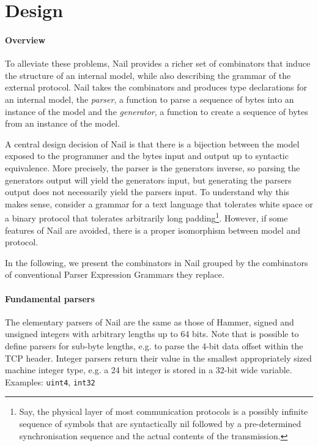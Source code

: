 \section{Design}

\paragraph{Overview}
To alleviate these problems, Nail provides a richer set of combinators that induce the structure of
an internal model, while also describing the grammar of the external protocol. Nail takes the
combinators and produces type declarations for an internal model, the \textit{parser}, a function to parse a sequence of
bytes into an instance of the model and the \textit{generator}, a function to create a sequence of
bytes from an instance of the model.

A central design decision of Nail is that there is a  bijection between the model exposed to the programmer and the bytes
input and output up to syntactic equivalence. More precisely, the parser is the generators inverse,
so parsing the generators output will yield the generators input, but generating the parsers output
does not necessarily yield the parsers input. To understand why this makes sense, consider a grammar
for a text language that tolerates white space or a binary protocol that tolerates arbitrarily long
padding\footnote{Say, the physical layer of most communication protocols is a possibly infinite
  sequence of symbols that are syntactically nil followed by a pre-determined synchronisation
  sequence and the actual contents of the transmission.}. However, if some features of Nail are
avoided, there is a proper isomorphism between model and protocol.

In the following, we present the combinators in Nail grouped by the combinators of conventional Parser Expression Grammars they replace.
\paragraph{Fundamental parsers}
The elementary parsers of Nail are the same as those of Hammer, signed and unsigned integers with
arbitrary lengths up to 64 bits. Note that is possible to define parsers for sub-byte lengths, e.g.
to parse the 4-bit data offset within the TCP header. Integer parsers return their value in the
smallest appropriately sized machine integer type, e.g. a 24 bit integer is stored in a 32-bit wide variable.\\
Examples: \texttt{uint4}, \texttt{int32}

